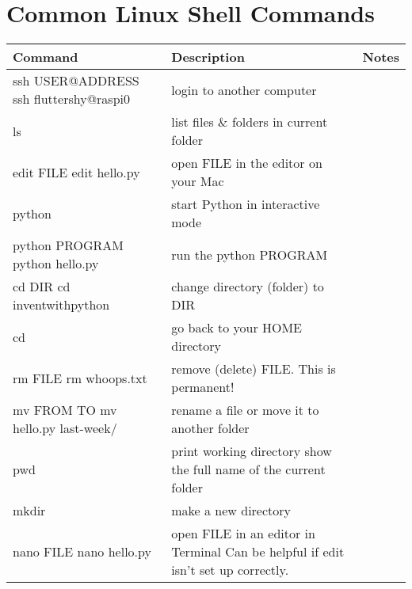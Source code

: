 \documentclass{article}
\begin{document}

\section{Common Linux Shell Commands}

\begin{tabularx}{\textwidth}{@{} Y Y Y @{}}
  Command & Description & Notes \\
  \midrule
   ssh USER@ADDRESS \newline ssh fluttershy@raspi0 & login to another computer & \\
   ls & list files \& folders in current folder & \\
   edit FILE \newline edit hello.py & open FILE in the editor on your Mac & \\
   python & start Python in interactive mode & \\
   python PROGRAM \newline python hello.py & run the python PROGRAM & \\
   cd DIR \newline cd inventwithpython & change directory (folder) to DIR & \\
   cd & go back to your  HOME directory & \\
   rm FILE \newline rm whoops.txt & remove (delete) FILE.  \newline This is permanent! & \\
   mv FROM TO \newline mv hello.py last-week/  & rename a file or move it to another folder & \\
   pwd & print working directory \newline show the full name of the current folder & \\
   mkdir & make a new directory & \\
   nano FILE \newline nano hello.py & open FILE in an editor in Terminal \newline Can be helpful if edit isn't set up correctly. & \\
\end{tabularx}
 
\end{document}
